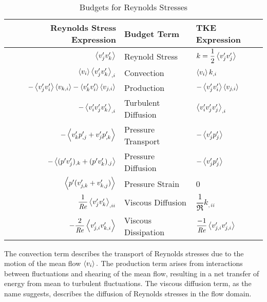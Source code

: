 \begin {table}[H]
\centering  \caption{Budgets for Reynolds Stresses}
\label{tbl:rs-budgets}
\begin{tabular}{| r | l | l |}
\hline
\textbf{Reynolds Stress Expression} & \textbf{Budget Term} & \textbf{TKE Expression}\\
\hline
$\expval{v'_jv'_k}$                                                     & Reynold Stress      & $k=\dfrac{1}{2}\expval{v'_jv'_j}$               \\[0.5em]
$\expval{v_i}\expval{v'_jv'_k}_{,i}$                                    & Convection          & $\expval{v_i}k_{,i}$                            \\[0.5em]
$-\expval{v'_j v'_i}\expval{v_{k,i}}-\expval{v'_k v'_i}\expval{v_{j,i}}$& Production          & $-\expval{v'_jv'_i}\expval{v_{j,i}}$            \\[0.5em]
$-\expval{v'_i v'_j v'_k}_{,i}$                                         & Turbulent Diffusion & $\expval{v'_iv'_jv'_j}_{,i}$                    \\[0.5em]
$-\expval{v'_kp'_{,j} + v'_jp'_{,k}}$                                   & Pressure Transport  & $-\expval{v'_jp'_j}$                            \\[0.5em]
$-\expval{(p'v'_j)_{,k} + (p'v'_k)_{,j}}$                               & Pressure Diffusion  & $-\expval{v'_jp'_j}$                            \\[0.5em]
$\expval{p'(v'_{j,k}+v'_{k,j})}$                                        & Pressure Strain     & 0                                               \\[0.5em]
$\dfrac{1}{\mathit{Re}}\expval{v'_j v'_k}_{,ii}$                          & Viscous Diffusion   & $\dfrac{1}{\Re}k_{,ii}$                   \\[0.5em]
$- \dfrac{2}{\mathit{Re}}\expval{v'_{j,i}v'_{k,i}}$                       & Viscous Dissipation & $\dfrac{-1}{\mathit{Re}}\expval{v'_{j,i}v'_{j,i}}$\\[0.5em]
\hline
\end{tabular}	
\end{table}

The convection term describes the transport of Reynolds stresses due to the motion of the mean flow $\expval{v_i}.$ The production term arises from interactions between fluctuations and shearing of the mean flow, resulting in a net transfer of energy from mean to turbulent fluctuations. The viscous diffusion term, as the name suggests, describes the diffusion of Reynolds stresses in the flow domain.


